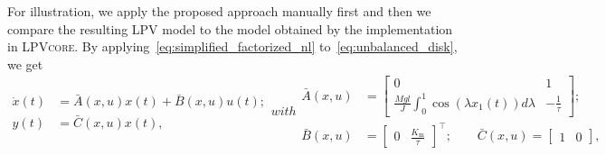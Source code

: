 
For illustration, we apply the proposed approach manually first and then we compare the resulting LPV model to the model obtained by the implementation in \textsc{LPVcore}. By applying~\eqref{eq:simplified_factorized_nl} to~\eqref{eq:unbalanced_disk}, we get
%
\begin{subequations}
    \begin{align}
        \dot{x}(t) & = \bar{A}(x, u)x(t) + \bar{B}(x, u) u(t); \\
        y(t)       & = \bar{C}(x, u) x(t),
    \end{align}
    with
    \begin{align*}
        \bar{A}(x, u) & = \begin{bmatrix}
                              0                                                                          & 1               \\
                              \frac{M g l}{J} \! \int_{0}^{1} \cos\left(\lambda x_1(t) \right) d \lambda & -\frac{1}{\tau}
                          \end{bmatrix};                    \\
        \bar{B}(x, u) & = \begin{bmatrix}
                              0 & \frac{K_\mathrm{m}}{\tau}
                          \end{bmatrix}^\top; \qquad \bar{C}(x, u)                                                       = \begin{bmatrix}
                                                                                                                               1 & 0
                                                                                                                           \end{bmatrix},
    \end{align*}
\end{subequations}
